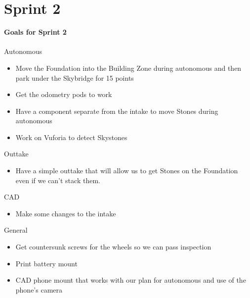 
\section{Sprint 2}

\textbf{Goals for Sprint 2}\\\\
    
    Autonomous
    \begin{itemize}
        \item Move the Foundation into the Building Zone during autonomous and then park under the Skybridge for 15 points
        \item Get the odometry pods to work
        \item Have a component separate from the intake to move Stones during autonomous
        \item Work on Vuforia to detect Skystones
    \end{itemize}
    
    Outtake
    \begin{itemize}
        \item Have a simple outtake that will allow us to get Stones on the Foundation even if we can't stack them.
    \end{itemize}
    
    CAD
    \begin{itemize}
        \item Make some changes to the intake
    \end{itemize}
    
    General
    \begin{itemize}
        \item Get countersunk screws for the wheels so we can pass inspection
        \item Print battery mount
        \item CAD phone mount that works with our plan for autonomous and use of the phone's camera
    \end{itemize}
\vspace{1in}



